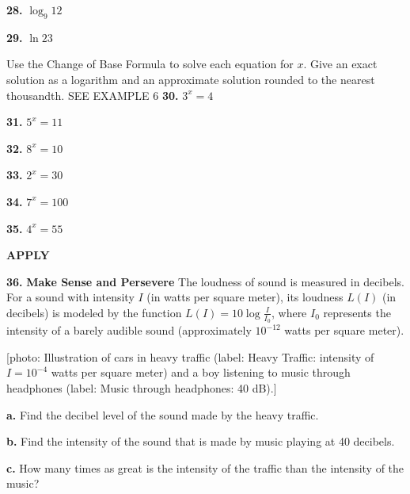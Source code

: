 \documentclass{article}
\newenvironment{practice}[2]{\textbf{#1.}}{}
\newcommand{\answer}[1]{}
\newcommand{\placeholder}[2]{[#1: #2]}
\begin{document}
\begin{practice}{28}{}
$\log_9 12$
\answer{$1.131$}
\end{practice}

\begin{practice}{29}{}
$\ln 23$
\answer{$3.135$}
\end{practice}

Use the Change of Base Formula to solve each equation for $x$. Give an exact solution as a logarithm and an approximate solution rounded to the nearest thousandth. SEE EXAMPLE 6
\begin{practice}{30}{}
$3^x = 4$
\answer{$x = \log_3 4 \approx 1.262$}
\end{practice}

\begin{practice}{31}{}
$5^x = 11$
\answer{$x = \log_5 11 \approx 1.490$}
\end{practice}

\begin{practice}{32}{}
$8^x = 10$
\answer{$x = \log_8 10 \approx 1.107$}
\end{practice}

\begin{practice}{33}{}
$2^x = 30$
\answer{$x = \log_2 30 \approx 4.907$}
\end{practice}

\begin{practice}{34}{}
$7^x = 100$
\answer{$x = \log_7 100 \approx 2.367$}
\end{practice}

\begin{practice}{35}{}
$4^x = 55$
\answer{$x = \log_4 55 \approx 2.891$}
\end{practice}


\vspace{1em}
\textbf{APPLY}

\begin{practice}{36}{}
\textbf{Make Sense and Persevere} The loudness of sound is measured in decibels. For a sound with intensity $I$ (in watts per square meter), its loudness $L(I)$ (in decibels) is modeled by the function $L(I) = 10\log\frac{I}{I_0}$, where $I_0$ represents the intensity of a barely audible sound (approximately $10^{-12}$ watts per square meter).

\placeholder{photo}{Illustration of cars in heavy traffic (label: Heavy Traffic: intensity of $I = 10^{-4}$ watts per square meter) and a boy listening to music through headphones (label: Music through headphones: 40 dB).}

\textbf{a.} Find the decibel level of the sound made by the heavy traffic.
\answer{$80$ dB}

\textbf{b.} Find the intensity of the sound that is made by music playing at 40 decibels.
\answer{$10^{-8}$ watts per square meter}

\textbf{c.} How many times as great is the intensity of the traffic than the intensity of the music?
\answer{$10,000$ times}
\end{practice}
\end{document}
